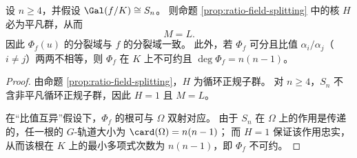 \begin{corollary}[全对称群下的比值完备性]\label{cor:ratio-field-full-symmetric}
设 \(n\ge 4\)，并假设 \(\Gal(f/K)\cong S_n\)。
则命题 \ref{prop:ratio-field-splitting} 中的核 \(H\) 必为平凡群，从而
\[
M=L.
\]
因此 \(\Phi_f(u)\) 的分裂域与 \(f\) 的分裂域一致。
此外，若 \(\Phi_f\) 可分且比值 \(\alpha_i/\alpha_j\)（\(i\neq j\)）两两不相等，则 \(\Phi_f\) 在 \(K\) 上不可约且 \(\deg\Phi_f=n(n-1)\)。
\end{corollary}
\begin{proof}
由命题 \ref{prop:ratio-field-splitting}，\(H\) 为循环正规子群。
对 \(n\ge 4\)，\(S_n\) 不含非平凡循环正规子群，因此 \(H=1\) 且 \(M=L\)。

在“比值互异”假设下，\(\Phi_f\) 的根可与 \(\Omega\) 双射对应。
由于 \(S_n\) 在 \(\Omega\) 上的作用是传递的，任一根的 \(G\)-轨道大小为 \(\card(\Omega)=n(n-1)\)；
而 \(H=1\) 保证该作用忠实，从而该根在 \(K\) 上的最小多项式次数为 \(n(n-1)\)，即 \(\Phi_f\) 不可约。
\end{proof}
